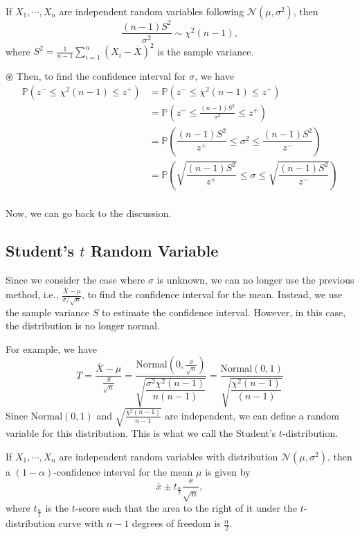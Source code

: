 \begin{corollary}
  If \(X_1, \cdots, X_n\) are independent random variables following \(\mathcal{N}(\mu, \sigma^2)\), then
  \[
    \dfrac{(n - 1)S^2}{\sigma^2} \sim \chi^2(n - 1),
  \]
  where \(S^2 = \frac{1}{n - 1}\sum_{i = 1}^n (X_i - \overline{X})^2\) is the sample variance.
\end{corollary}


\(\circledast \) Then, to find the confidence interval for \(\sigma\), we have
\[
  \begin{aligned}
    \mathbb{P}(z^- \leq \chi^2(n - 1) \leq z^+) &= \mathbb{P}(z^- \leq \chi^2(n - 1) \leq z^+) \\
    &= \mathbb{P}(z^- \leq \frac{(n-1)S^2}{\sigma^2} \leq z^+) \\
    &= \mathbb{P}(\dfrac{(n - 1)S^2}{z^+} \leq \sigma^2 \leq \dfrac{(n - 1)S^2}{z^-}) \\
    &= \mathbb{P}(\sqrt{\dfrac{(n - 1)S^2}{z^+}} \leq \sigma \leq \sqrt{\dfrac{(n - 1)S^2}{z^-}}) \\
  \end{aligned}
\]


Now, we can go back to the discussion. 

\subsection{Student's \(t\) Random Variable}
Since we consider the case where \(\sigma\) is unknown, we can no longer use the previous method, i.e., \(\frac{\overline{X} - \mu}{\sigma / \sqrt{n}}\), to find the confidence interval for the mean. Instead, we use the sample variance \(S\) to estimate the confidence interval. However, in this case, the distribution is no longer normal.

For example, we have 
\[
    T = \frac{\overline{X} - \mu}{\frac{S}{\sqrt{n}}} = \dfrac{\text{Normal}(0, \frac{\sigma}{\sqrt{n}})}{\sqrt{\dfrac{\sigma^2 \chi^2(n - 1)}{n(n - 1)}}} = \dfrac{\text{Normal}(0, 1)}{\sqrt{\dfrac{\chi^2(n - 1)}{(n - 1)}}}
\]
Since \(\text{Normal}(0, 1)\) and \(\sqrt{\frac{\chi^2(n - 1)}{n - 1}}\) are independent, we can define a random variable for this distribution. This is what we call the Student's \(t\)-distribution.

If \(X_1, \cdots, X_n\) are independent random variables with distribution \(\mathcal{N}(\mu, \sigma^2)\), then a \((1 - \alpha)\)-confidence interval for the mean \(\mu\) is given by
\[
  \overline{x} \pm t_{\frac{\alpha}{2}} \dfrac{s}{\sqrt{n}},
\]
where \(t_{\frac{\alpha}{2}}\) is the \(t\)-score such that the area to the right of it under the \(t\)-distribution curve with \(n - 1\) degrees of freedom is \(\frac{\alpha}{2}\).

